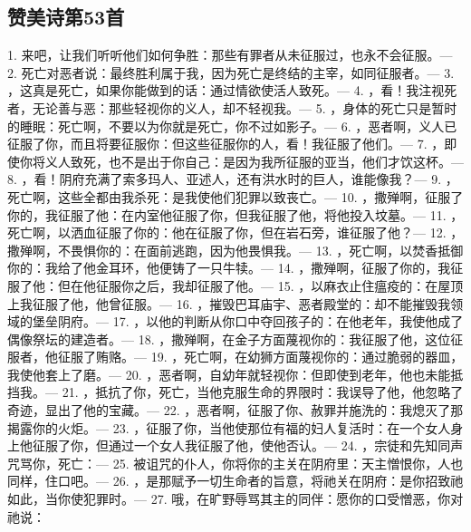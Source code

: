 
\subsection{赞美诗第53首}

1. 来吧，让我们听听他们如何争胜：那些有罪者从未征服过，也永不会征服。— 2. 死亡对恶者说：最终胜利属于我，因为死亡是终结的主宰，如同征服者。— 3. ，这真是死亡，如果你能做到的话：通过情欲使活人致死。— 4. ，看！我注视死者，无论善与恶：那些轻视你的义人，却不轻视我。— 5. ，身体的死亡只是暂时的睡眠：死亡啊，不要以为你就是死亡，你不过如影子。— 6. ，恶者啊，义人已征服了你，而且将要征服你：但这些征服你的人，看！我征服了他们。— 7. ，即使你将义人致死，也不是出于你自己：是因为我所征服的亚当，他们才饮这杯。— 8. ，看！阴府充满了索多玛人、亚述人，还有洪水时的巨人，谁能像我？— 9. ，死亡啊，这些全都由我杀死：是我使他们犯罪以致丧亡。— 10. ，撒殚啊，征服了你的，我征服了他：在内室他征服了你，但我征服了他，将他投入坟墓。— 11. ，死亡啊，以洒血征服了你的：他在征服了你，但在岩石旁，谁征服了他？— 12. ，撒殚啊，不畏惧你的：在面前逃跑，因为他畏惧我。— 13. ，死亡啊，以焚香抵御你的：我给了他金耳环，他便铸了一只牛犊。— 14. ，撒殚啊，征服了你的，我征服了他：但在他征服你之后，我却征服了他。— 15. ，以麻衣止住瘟疫的：在屋顶上我征服了他，他曾征服。— 16. ，摧毁巴耳庙宇、恶者殿堂的：却不能摧毁我领域的堡垒阴府。— 17. ，以他的判断从你口中夺回孩子的：在他老年，我使他成了偶像祭坛的建造者。— 18. ，撒殚啊，在金子方面蔑视你的：我征服了他，这位征服者，他征服了贿赂。— 19. ，死亡啊，在幼狮方面蔑视你的：通过脆弱的器皿，我使他套上了磨。— 20. ，恶者啊，自幼年就轻视你：但即使到老年，他也未能抵挡我。— 21. ，抵抗了你，死亡，当他克服生命的界限时：我误导了他，他忽略了奇迹，显出了他的宝藏。— 22. ，恶者啊，征服了你、赦罪并施洗的：我熄灭了那揭露你的火炬。— 23. ，征服了你，当他使那位有福的妇人复活时：在一个女人身上他征服了你，但通过一个女人我征服了他，使他否认。— 24. ，宗徒和先知同声咒骂你，死亡：— 25. 被诅咒的仆人，你将你的主关在阴府里：天主憎恨你，人也同样，住口吧。— 26. ，是那赋予一切生命者的旨意，将祂关在阴府：是你招致祂如此，当你使犯罪时。— 27. 哦，在旷野辱骂其主的同伴：愿你的口受憎恶，你对祂说：\par

